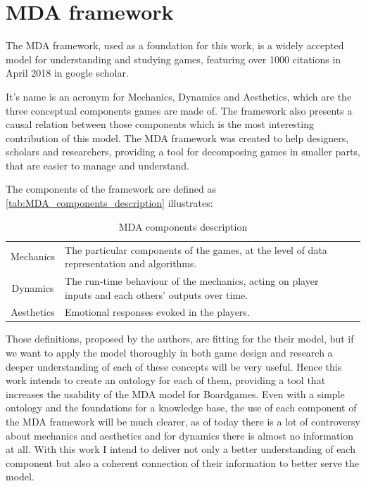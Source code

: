 \section{MDA framework}

The MDA framework, used as a foundation for this work, is a widely accepted model for understanding and studying games, featuring over 1000 citations in April 2018 in google scholar. 

It's name is an acronym for Mechanics, Dynamics and Aesthetics, which are the three conceptual components games are made of. The framework also presents a causal relation between those components which is the most interesting contribution of this model. The MDA framework was created to help designers, scholars and researchers, providing a tool for decomposing games in smaller parts, that are easier to manage and understand. 

The components of the framework are defined as \autoref{tab:MDA_components_description} illustrates:
{\renewcommand{\arraystretch}{1.5}
\begin{table}[!h]
    \caption{MDA components description \citep{Hunicke2004}}
    \vspace{.5em}
    \centering
    \begin{tabular}{c|m{6cm}l|}
    Mechanics &  The particular components of the games, at the level of data representation and algorithms.\\ \cline{1-2}
    Dynamics & The run-time behaviour of the mechanics, acting on player inputs and each others' outputs over time.\\ \cline{1-2} 
    Aesthetics & Emotional responses evoked in the players.\\
    \end{tabular}
    \label{tab:MDA_components_description}
\end{table}}



Those definitions, proposed by the authors, are fitting for the their model, but if we want to apply the model thoroughly in both game design and research a deeper understanding of each of these concepts will be very useful. Hence this work intends to create an ontology for each of them, providing a tool that increases the usability of the MDA model for Boardgames. Even with a simple ontology and the foundations for a knowledge base, the use of each component of the MDA framework will be much clearer, as of today there is a lot of controversy about mechanics and aesthetics and for dynamics there is almost no information at all. With this work I intend to deliver not only a better  understanding of each component but also a coherent connection of their information to better serve the model.

